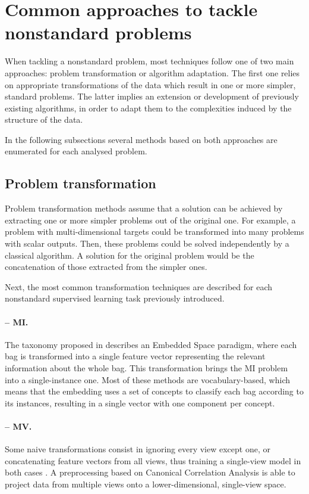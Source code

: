 \section{Common approaches to tackle nonstandard problems}
\label{p3sec:algorithms}

When tackling a nonstandard problem, most techniques follow one of two main approaches: problem transformation or algorithm adaptation. The first one relies on appropriate transformations of the data which result in one or more simpler, standard problems. The latter implies an extension or development of previously existing algorithms, in order to adapt them to the complexities induced by the structure of the data.

In the following subsections several methods based on both approaches are enumerated for each analysed problem.

\subsection{Problem transformation}

Problem transformation methods assume that a solution can be achieved by extracting one or more simpler problems out of the original one. For example, a problem with multi-dimensional targets could be transformed into many problems with scalar outputs. Then, these problems could be solved independently by a classical algorithm. A solution for the original problem would be the concatenation of those extracted from the simpler ones.

Next, the most common transformation techniques are described for each nonstandard supervised learning task previously introduced.


\paragraph{-- MI.} 
The taxonomy proposed in \cite{mic-taxonomy} describes an Embedded Space paradigm, where each bag is transformed into a single feature vector representing the relevant information about the whole bag. This transformation brings the MI problem into a single-instance one. Most of these methods are voca\-bulary-based, which means that the embedding uses a set of concepts to classify each bag according to its instances, resulting in a single vector with one component per concept.

\paragraph{-- MV.} Some naive transformations consist in ignoring every view except one, or concatenating feature vectors from all views, thus training a single-view model in both cases \cite{mv-spectral}. A preprocessing based on Canonical Correlation Analysis \cite{mv-cca} is able to project data from multiple views onto a lower-dimensional, single-view space.

